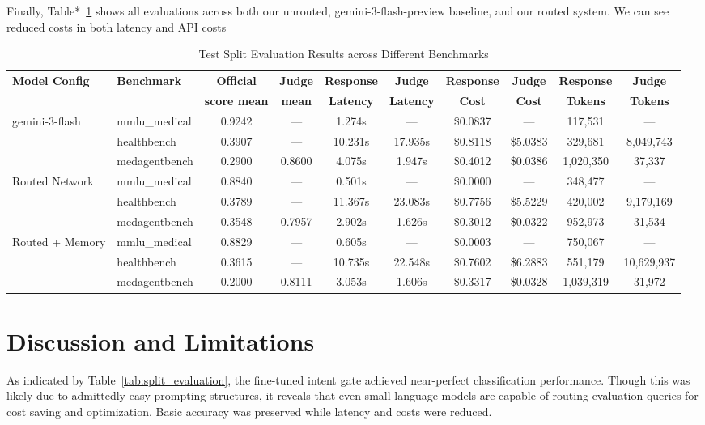 \documentclass[conference]{IEEEtran}
\begin{document}
Finally, Table*~\ref{tab:test_split_evaluation} shows all evaluations across both our unrouted, gemini-3-flash-preview baseline, and our routed system. We can see reduced costs in both latency and API costs

\begin{table}[htbp]
\centering
\caption{Test Split Evaluation Results across Different Benchmarks}
\label{tab:test_split_evaluation}
\begin{tabular}{llcccccccc}
\toprule
\textbf{Model Config} & \textbf{Benchmark} & \textbf{Official} & \textbf{Judge} & \textbf{Response} & \textbf{Judge} & \textbf{Response} & \textbf{Judge} & \textbf{Response} & \textbf{Judge} \\
 & & \textbf{score mean} & \textbf{mean} & \textbf{Latency} & \textbf{Latency} & \textbf{Cost} & \textbf{Cost} & \textbf{Tokens} & \textbf{Tokens} \\
\midrule
gemini-3-flash & mmlu\_medical & 0.9242 & --- & 1.274s & --- & \$0.0837 & --- & 117,531 & --- \\
 & healthbench & 0.3907 & --- & 10.231s & 17.935s & \$0.8118 & \$5.0383 & 329,681 & 8,049,743 \\
 & medagentbench & 0.2900 & 0.8600 & 4.075s & 1.947s & \$0.4012 & \$0.0386 & 1,020,350 & 37,337 \\
\midrule
Routed Network & mmlu\_medical & 0.8840 & --- & 0.501s & --- & \$0.0000 & --- & 348,477 & --- \\
 & healthbench & 0.3789 & --- & 11.367s & 23.083s & \$0.7756 & \$5.5229 & 420,002 & 9,179,169 \\
 & medagentbench & 0.3548 & 0.7957 & 2.902s & 1.626s & \$0.3012 & \$0.0322 & 952,973 & 31,534 \\
\midrule
Routed + Memory & mmlu\_medical & 0.8829 & --- & 0.605s & --- & \$0.0003 & --- & 750,067 & --- \\
 & healthbench & 0.3615 & --- & 10.735s & 22.548s & \$0.7602 & \$6.2883 & 551,179 & 10,629,937 \\
 & medagentbench & 0.2000 & 0.8111 & 3.053s & 1.606s & \$0.3317 & \$0.0328 & 1,039,319 & 31,972 \\
\bottomrule
\end{tabular}
\end{table}

\section{Discussion and Limitations}

As indicated by Table~\ref{tab:split_evaluation}, the fine-tuned intent gate achieved near-perfect classification performance. Though this was likely due to admittedly easy prompting structures, it reveals that even small language models are capable of routing evaluation queries for cost saving and optimization. Basic accuracy was preserved while latency and costs were reduced. 
\end{document}
